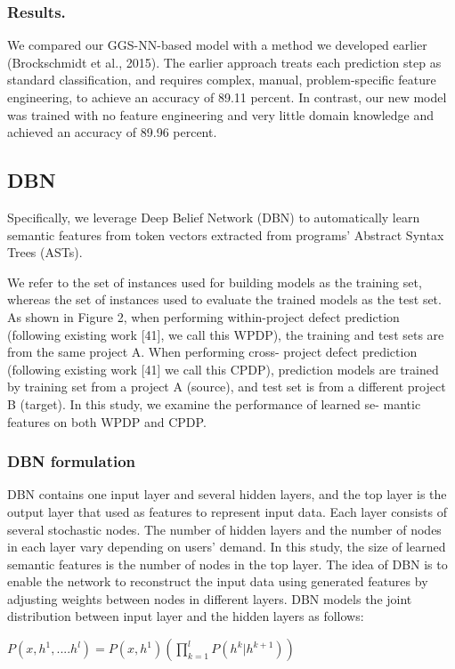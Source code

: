 \documentclass{article}
\begin{document}
\subsubsection{Results.}
We compared our GGS-NN-based model with a method we developed earlier (Brockschmidt et al., 2015). The earlier approach treats each prediction step as standard classification, and requires complex, manual, problem-specific feature engineering, to achieve an accuracy of 89.11 percent. In contrast, our new model was trained with no feature engineering and very little domain knowledge and achieved an accuracy of 89.96 percent.
\subsection{DBN}
Specifically, we leverage Deep Belief Network (DBN) to automatically learn semantic features from token vectors extracted from programs’ Abstract Syntax Trees (ASTs).

We refer to the set of instances used for building models as the training set, whereas the set of instances used to evaluate the trained models as the test set. As shown in Figure 2, when performing within-project defect prediction (following existing work [41], we call this WPDP), the training and test sets are from the same project A. When performing cross- project defect prediction (following existing work [41] we call this CPDP), prediction models are trained by training set from a project A (source), and test set is from a different project B (target).
In this study, we examine the performance of learned se- mantic features on both WPDP and CPDP.
\subsubsection{DBN formulation}
DBN contains one input layer and several hidden layers, and the top layer is the output layer that used as features to represent input data. Each layer consists of several stochastic nodes. The number of hidden layers and the number of nodes in each layer vary depending on users’ demand. In this study, the size of learned semantic features is the number of nodes in the top layer. The idea of DBN is to enable the network to reconstruct the input data using generated features by adjusting weights between nodes in different layers.
DBN models the joint distribution between input layer and the hidden layers as follows:

\begin{math}
P(x,h^1,....h^l) = P(x,h^1)(\prod_{k=1}^l P(h^k|h^{k+1}))
\end{math}
\end{document}
